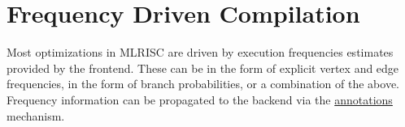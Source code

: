 \section{Frequency Driven Compilation}

Most optimizations in MLRISC are driven by execution frequencies
estimates provided by the frontend.  These can be in the form of explicit
vertex and edge frequencies, in the form of branch probabilities, or a
combination of the above.  Frequency information can be propagated
to the backend via the \href{annotations.html}{annotations} mechanism. 
